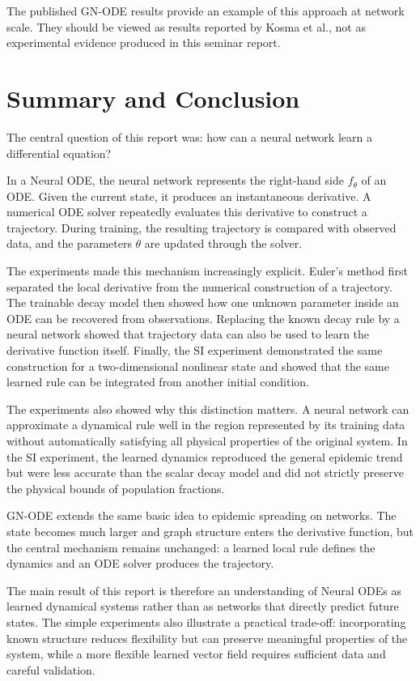 \documentclass[11pt,a4paper]{article}
\begin{document}
The published GN-ODE results provide an example of this approach at network
scale. They should be viewed as results reported by Kosma et al., not as
experimental evidence produced in this seminar report.

\section{Summary and Conclusion}

The central question of this report was: how can a neural network learn a
differential equation?

In a Neural ODE, the neural network represents the right-hand side
$f_\theta$ of an ODE. Given the current state, it produces an instantaneous
derivative. A numerical ODE solver repeatedly evaluates this derivative to
construct a trajectory. During training, the resulting trajectory is compared
with observed data, and the parameters $\theta$ are updated through the
solver.

The experiments made this mechanism increasingly explicit. Euler's method
first separated the local derivative from the numerical construction of a
trajectory. The trainable decay model then showed how one unknown parameter
inside an ODE can be recovered from observations. Replacing the known decay
rule by a neural network showed that trajectory data can also be used to learn
the derivative function itself. Finally, the SI experiment demonstrated the
same construction for a two-dimensional nonlinear state and showed that the
same learned rule can be integrated from another initial condition.

The experiments also showed why this distinction matters. A neural network can
approximate a dynamical rule well in the region represented by its training
data without automatically satisfying all physical properties of the original
system. In the SI experiment, the learned dynamics reproduced the general
epidemic trend but were less accurate than the scalar decay model and did not
strictly preserve the physical bounds of population fractions.

GN-ODE extends the same basic idea to epidemic spreading on networks. The
state becomes much larger and graph structure enters the derivative function,
but the central mechanism remains unchanged: a learned local rule defines the
dynamics and an ODE solver produces the trajectory.

The main result of this report is therefore an understanding of Neural ODEs as
learned dynamical systems rather than as networks that directly predict future
states. The simple experiments also illustrate a practical trade-off:
incorporating known structure reduces flexibility but can preserve meaningful
properties of the system, while a more flexible learned vector field requires
sufficient data and careful validation.
\end{document}
